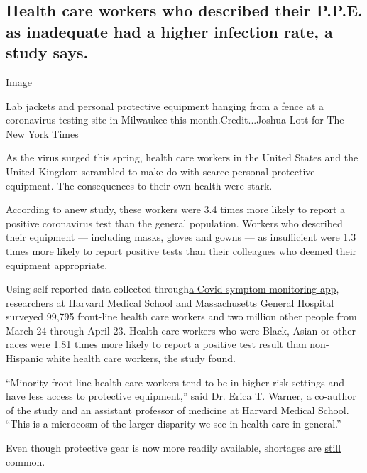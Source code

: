 \hypertarget{health-care-workers-who-described-their-ppe-as-inadequate-had-a-higher-infection-rate-a-study-says}{%
\subsection{Health care workers who described their P.P.E. as inadequate
had a higher infection rate, a study
says.}\label{health-care-workers-who-described-their-ppe-as-inadequate-had-a-higher-infection-rate-a-study-says}}

Image

Lab jackets and personal protective equipment hanging from a fence at a
coronavirus testing site in Milwaukee this month.Credit...Joshua Lott
for The New York Times

As the virus surged this spring, health care workers in the United
States and the United Kingdom scrambled to make do with scarce personal
protective equipment. The consequences to their own health were stark.

According to
a\href{https://www.thelancet.com/journals/lanpub/article/PIIS2468-2667(20)30164-X/fulltext}{new
study,} these workers were 3.4 times more likely to report a positive
coronavirus test than the general population. Workers who described
their equipment --- including masks, gloves and gowns --- as
insufficient were 1.3 times more likely to report positive tests than
their colleagues who deemed their equipment appropriate.

Using self-reported data collected
through\href{https://covid.joinzoe.com/us}{a Covid-symptom monitoring
app}, researchers at Harvard Medical School and Massachusetts General
Hospital surveyed 99,795 front-line health care workers and two million
other people from March 24 through April 23. Health care workers who
were Black, Asian or other races were 1.81 times more likely to report a
positive test result than non-Hispanic white health care workers, the
study found.

``Minority front-line health care workers tend to be in higher-risk
settings and have less access to protective equipment,'' said
\href{https://cgvh.harvard.edu/people/erica-warner}{Dr. Erica T.
Warner,} a co-author of the study and an assistant professor of medicine
at Harvard Medical School. ``This is a microcosm of the larger disparity
we see in health care in general.''

Even though protective gear is now more readily available, shortages are
\href{https://www.nytimes3xbfgragh.onion/2020/07/08/health/coronavirus-masks-ppe-doc.html}{still
common}.

